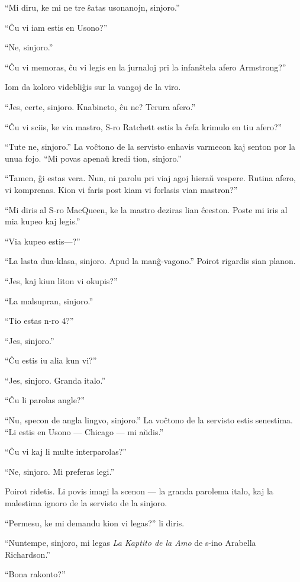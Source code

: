 ``Mi diru, ke mi ne tre ŝatas usonanojn, sinjoro.''

``Ĉu vi iam estis en Usono?''

``Ne, sinjoro.''

``Ĉu vi memoras, ĉu vi legis en la ĵurnaloj pri la infanŝtela afero Armstrong?''

Iom da koloro videbliĝis sur la vangoj de la viro.

``Jes, certe, sinjoro. Knabineto, ĉu ne? Terura afero.''

``Ĉu vi sciis, ke via mastro, S-ro Ratchett estis la ĉefa krimulo en tiu afero?''

``Tute ne, sinjoro.'' La voĉtono de la servisto enhavis varmecon kaj senton por la unua fojo. ``Mi povas apenaŭ kredi tion, sinjoro.''

``Tamen, ĝi estas vera. Nun, ni parolu pri viaj agoj hieraŭ vespere. Rutina afero, vi komprenas. Kion vi faris post kiam vi forlasis vian mastron?''

``Mi diris al S-ro MacQueen, ke la mastro deziras lian ĉeeston. Poste mi iris al mia kupeo kaj legis.''

``Via kupeo estis---?''

``La lasta dua-klasa, sinjoro. Apud la manĝ-vagono.'' Poirot rigardis sian planon.

``Jes, kaj kiun liton vi okupis?''

``La malsupran, sinjoro.''

``Tio estas n-ro 4?''

``Jes, sinjoro.''

``Ĉu estis iu alia kun vi?''

``Jes, sinjoro. Granda italo.''

``Ĉu li parolas angle?''

``Nu, specon de angla lingvo, sinjoro.'' La voĉtono de la servisto estis senestima. ``Li estis en Usono --- Chicago --- mi aŭdis.''

``Ĉu vi kaj li multe interparolas?''

``Ne, sinjoro. Mi preferas legi.''

Poirot ridetis. Li povis imagi la scenon --- la granda parolema italo, kaj la malestima ignoro de la servisto de la sinjoro.

``Permesu, ke mi demandu kion vi legas?'' li diris.

``Nuntempe, sinjoro, mi legas \emph{La Kaptito de la Amo} de s-ino Arabella Richardson.''

``Bona rakonto?''

